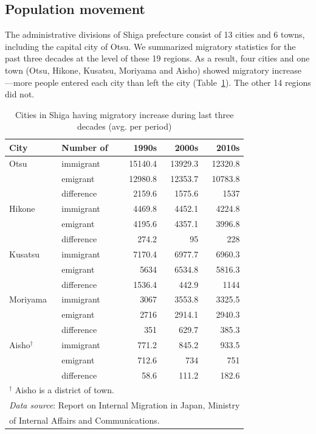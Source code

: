 \documentclass[10pt, conference, compsocconf]{IEEEtran}
\begin{document}
\subsection{Population movement}\label{move}

The administrative divisions of Shiga prefecture consist of 13 cities and 6 towns, including the capital city of Otsu.
We summarized migratory statistics for the past three decades at the level of these 19 regions. 
As a result, four cities and one town (Otsu, Hikone, Kusatsu, Moriyama and Aisho) showed migratory increase
---more people entered each city than left the city (Table~\ref{popshiga}). The other 14 regions did not. 

\begin{table}[!t]
\caption{Cities in Shiga having migratory increase during last three decades (avg. per period) }\label{popshiga}
\centering
\begin{tabular}{llrrr}
\hline
\bf City & \bf Number of & \bf 1990s & \bf 2000s & \bf 2010s  \\\hline
Otsu & immigrant & 15140.4 & 13929.3 & 12320.8 \\
 & emigrant & 12980.8 & 12353.7 & 10783.8 \\
 & difference & 2159.6 & 1575.6 & 1537 \\\hline
Hikone & immigrant & 4469.8 & 4452.1 & 4224.8 \\
 & emigrant & 4195.6 & 4357.1 & 3996.8 \\
 & difference & 274.2 & 95 & 228 \\\hline
Kusatsu & immigrant & 7170.4 & 6977.7 & 6960.3\\
 & emigrant & 5634 & 6534.8 & 5816.3 \\
 & difference & 1536.4 & 442.9 & 1144  \\\hline
Moriyama & immigrant & 3067 & 3553.8 & 3325.5 \\ 
 & emigrant & 2716 & 2914.1 & 2940.3 \\ 
 & difference & 351 & 629.7 & 385.3 \\\hline
Aisho$^\dagger$
 & immigrant & 771.2 & 845.2 & 933.5  \\
 & emigrant & 712.6 & 734 & 751  \\
 & difference & 58.6 & 111.2 & 182.6 \\\hline
\multicolumn{5}{l}{$^\dagger$ Aisho is a district of town.}
\\
\multicolumn{5}{l}{{\it Data source}: Report on Internal Migration in Japan, Ministry}
\\
\multicolumn{5}{l}{of Internal Affairs and Communications.}
\\
\end{tabular}
\end{table}
\end{document}
